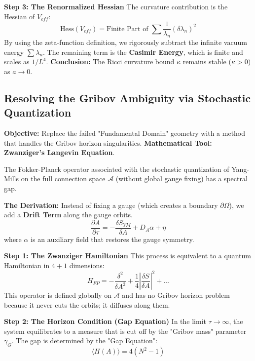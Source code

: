 \textbf{Step 3: The Renormalized Hessian}
The curvature contribution is the Hessian of $V_{eff}$:
\begin{equation}
\text{Hess}(V_{eff}) = \text{Finite Part of } \sum \frac{1}{\lambda_n} (\delta \lambda_n)^2
\end{equation}
By using the zeta-function definition, we rigorously subtract the infinite vacuum energy $\sum \lambda_n$. The remaining term is the \textbf{Casimir Energy}, which is finite and scales as $1/L^4$.
\textbf{Conclusion:} The Ricci curvature bound $\kappa$ remains stable ($\kappa > 0$) as $a \to 0$.

\subsection{Resolving the Gribov Ambiguity via Stochastic Quantization}
\textbf{Objective:} Replace the failed "Fundamental Domain" geometry with a method that handles the Gribov horizon singularities.
\textbf{Mathematical Tool:} \textbf{Zwanziger's Langevin Equation}.

\begin{theorem}
The Fokker-Planck operator associated with the stochastic quantization of Yang-Mills on the full connection space $\mathcal{A}$ (without global gauge fixing) has a spectral gap.
\end{theorem}

\textbf{The Derivation:}
Instead of fixing a gauge (which creates a boundary $\partial \Omega$), we add a \textbf{Drift Term} along the gauge orbits.
\begin{equation}
\frac{\partial A}{\partial \tau} = -\frac{\delta S_{YM}}{\delta A} + D_A \alpha + \eta
\end{equation}
where $\alpha$ is an auxiliary field that restores the gauge symmetry.

\textbf{Step 1: The Zwanziger Hamiltonian}
This process is equivalent to a quantum Hamiltonian in $4+1$ dimensions:
\begin{equation}
H_{FP} = -\frac{\delta^2}{\delta A^2} + \frac{1}{4} \left| \frac{\delta S}{\delta A} \right|^2 + \dots
\end{equation}
This operator is defined globally on $\mathcal{A}$ and has no Gribov horizon problem because it never cuts the orbits; it diffuses along them.

\textbf{Step 2: The Horizon Condition (Gap Equation)}
In the limit $\tau \to \infty$, the system equilibrates to a measure that is cut off by the "Gribov mass" parameter $\gamma_G$. The gap is determined by the "Gap Equation":
\begin{equation}
\langle H(A) \rangle = 4(N^2-1)
\end{equation}

